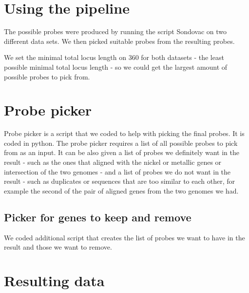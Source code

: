 
\section{Using the pipeline}
The possible probes were produced by running the script Sondovac on two different data sets. We then picked suitable probes from 
the resulting probes. 

We set the minimal total locus length on $360$ for both datasets - the least possible minimal total locus length - so we could get 
the largest amount of possible probes to pick from. 


\section{Probe picker}
Probe picker is a script that we coded to help with picking the final probes. It is coded in python. The probe picker requires 
a list of all possible probes to pick from as an input. It can be also given a list of probes we definitely want in the result - such as the 
ones that aligned with the nickel or metallic genes or intersection of the two genomes - and a list of probes we do not want in 
the result - such as duplicates or sequences that are too similar to each other, for 
example the second of the pair of aligned genes from the two genomes we had. 


\subsection{Picker for genes to keep and remove}
We coded additional script that creates the list of probes we want to have in the result and those we want to remove. 

\section{Resulting data}

